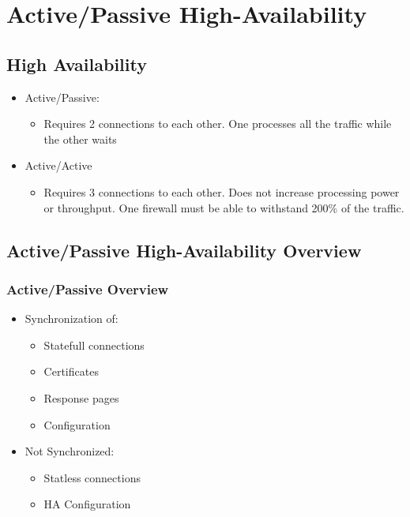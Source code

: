 \section{Active/Passive High-Availability}
\subsection{High Availability}
\begin{itemize}
    \item Active/Passive:
        \begin{itemize}
            \item Requires 2 connections to each other. One processes all the traffic while the other waits
        \end{itemize}
    \item Active/Active
        \begin{itemize}
            \item Requires 3 connections to each other. Does not increase processing power or throughput. One firewall must be able to withstand 200\% of the traffic.
        \end{itemize}
\end{itemize}

\subsection{Active/Passive High-Availability Overview}
\subsubsection{Active/Passive Overview}
\begin{itemize}
    \item Synchronization of:
        \begin{itemize}
            \item Statefull connections 
            \item Certificates
            \item Response pages
            \item Configuration
        \end{itemize}
    \item Not Synchronized:
        \begin{itemize}
            \item Statless connections
            \item HA Configuration
        \end{itemize}
\end{itemize}

